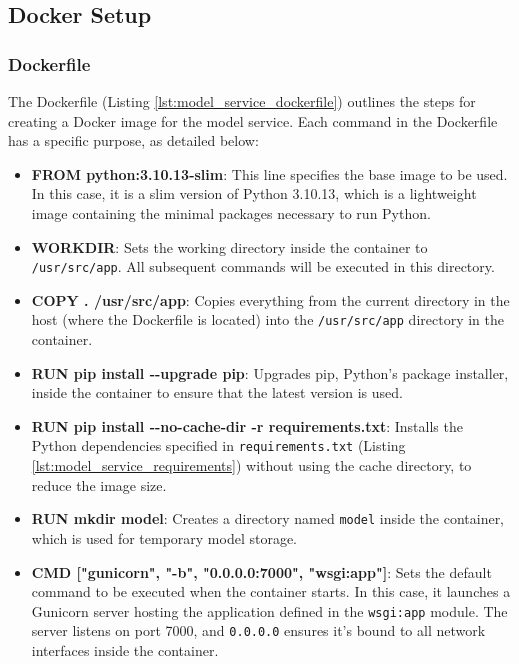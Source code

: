 \subsection{Docker Setup}
\subsubsection{Dockerfile}

The Dockerfile (Listing \ref{lst:model_service_dockerfile}) outlines the steps for creating a Docker image for the model service. Each command in the Dockerfile has a specific purpose, as detailed below:

\begin{itemize}
    \item \textbf{FROM python:3.10.13-slim}: This line specifies the base image to be used. In this case, it is a slim version of Python 3.10.13, which is a lightweight image containing the minimal packages necessary to run Python.

    \item \textbf{WORKDIR}: Sets the working directory inside the container to \texttt{/usr/src/app}. All subsequent commands will be executed in this directory.

    \item \textbf{COPY . /usr/src/app}: Copies everything from the current directory in the host (where the Dockerfile is located) into the \texttt{/usr/src/app} directory in the container.

    \item \textbf{RUN pip install -{}-upgrade pip}: Upgrades pip, Python's package installer, inside the container to ensure that the latest version is used.

    \item \textbf{RUN pip install -{}-no-cache-dir -r requirements.txt}: Installs the Python dependencies specified in \texttt{requirements.txt} (Listing \ref{lst:model_service_requirements}) without using the cache directory, to reduce the image size.

    \item \textbf{RUN mkdir model}: Creates a directory named \texttt{model} inside the container, which is used for temporary model storage.

    \item \textbf{CMD ["gunicorn", "-b", "0.0.0.0:7000", "wsgi:app"]}: Sets the default command to be executed when the container starts. In this case, it launches a Gunicorn server hosting the application defined in the \texttt{wsgi:app} module. The server listens on port 7000, and \texttt{0.0.0.0} ensures it's bound to all network interfaces inside the container. 
\end{itemize}

